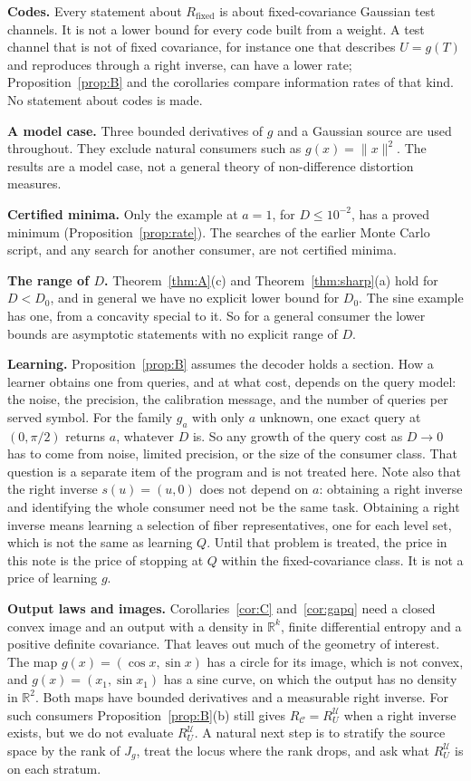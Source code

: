\documentclass[11pt,onecolumn]{IEEEtran}
\newcommand{\R}{\mathbb{R}}
\newcommand{\cU}{\mathcal U}
\newcommand{\Rfix}{R_{\mathrm{fixed}}}
\newcommand{\RC}{R_{\mathcal C}}
\begin{document}
\textbf{Codes.} Every statement about $\Rfix$ is about fixed-covariance Gaussian test
channels. It is not a lower bound for every code built from a weight. A test channel
that is not of fixed covariance, for instance one that describes $U=g(T)$ and reproduces
through a right inverse, can have a lower rate; Proposition~\ref{prop:B} and the
corollaries compare information rates of that kind. No statement about codes is made.

\textbf{A model case.} Three bounded derivatives of $g$ and a Gaussian source are used
throughout. They exclude natural consumers such as $g(x)=\|x\|^2$. The results are a model
case, not a general theory of non-difference distortion measures.

\textbf{Certified minima.} Only the example at $a=1$, for $D\le10^{-2}$, has a proved minimum
(Proposition~\ref{prop:rate}). The searches of the earlier Monte Carlo script, and any
search for another consumer, are not certified minima.

\textbf{The range of $D$.} Theorem~\ref{thm:A}(c) and Theorem~\ref{thm:sharp}(a) hold for
$D<D_0$, and in general we have no explicit lower bound for $D_0$. The sine example has
one, from a concavity special to it. So for a general consumer the lower bounds are
asymptotic statements with no explicit range of $D$.

\textbf{Learning.} Proposition~\ref{prop:B} assumes the decoder holds a section. How a
learner obtains one from queries, and at what cost, depends on the query model: the
noise, the precision, the calibration message, and the number of queries per served
symbol. For the family $g_a$ with only $a$ unknown, one exact query at $(0,\pi/2)$
returns $a$, whatever $D$ is. So any growth of the query cost as $D\to0$ has to come
from noise, limited precision, or the size of the consumer class. That question is a separate item of the program and is not treated here. Note also that
the right inverse $s(u)=(u,0)$ does not depend on $a$: obtaining a right inverse and
identifying the whole consumer need not be the same task. Obtaining a right inverse means
learning a selection of fiber representatives, one for each level set, which is not
the same as learning $Q$. Until that problem is treated, the price in this note is the
price of stopping at $Q$ within the fixed-covariance class. It is not a price of learning
$g$.

\textbf{Output laws and images.} Corollaries~\ref{cor:C} and~\ref{cor:gapq} need a
closed convex image and an output with a density in $\R^k$, finite differential entropy
and a positive definite covariance. That leaves out much of the geometry of interest. The
map $g(x)=(\cos x,\sin x)$ has a circle for its image, which is not convex, and
$g(x)=(x_1,\sin x_1)$ has a sine curve, on which the output has no density in $\R^2$.
Both maps have bounded derivatives and a measurable right inverse. For such
consumers Proposition~\ref{prop:B}(b) still gives $\RC=R_U^{\cU}$ when a right inverse
exists, but we do not evaluate $R_U^{\cU}$. A natural next step is to stratify the source
space by the rank of $J_g$, treat the locus where the rank drops, and ask what
$R_U^{\cU}$ is on each stratum.
\end{document}
